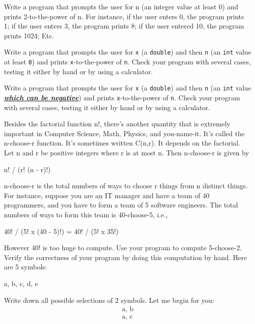 \begin{ex}
Write a program that prompts the user for n (an
integer value at least 0) and prints 2-to-the-power of n. For instance,
if the user enters 0, the program prints 1; if the user enters 3, the
program prints 8; if the user entered 10, the program prints 1024; Etc.
\end{ex}

\begin{ex}
Write a program that prompts the user for \texttt{x} (a
\texttt{double}) and then \texttt{n} (an \texttt{int} value at least \texttt{0})
and prints \texttt{x}-to-the-power of \texttt{n}. Check your program with
several cases, testing it either by hand or by using a calculator.
\end{ex}

\begin{ex}
Write a program that prompts the user for \texttt{x} (a \texttt{double}) and then \texttt{n} (an \texttt{int} value \underline{\textbf{\emph{which can be negative}}}) and prints \texttt{x}-to-the-power
of \texttt{n}. Check your program with several cases, testing it either by
hand or by using a calculator.
\end{ex}
\begin{ex}
Besides the factorial function n!,
there's another quantity that is extremely important in
Computer Science, Math, Physics, and you-name-it. It's
called the n-choose-r function. It's sometimes written
C(n,r). It depends on the factorial. Let n and r be positive integers
where r is at most n. Then n-choose-r is given by
\end{ex}
\begin{center}
n! / (r! (n - r)!)
\end{center}
n-choose-r is the total numbers of ways to choose r things from n
distinct things. For instance, suppose you are an IT manager and have a
team of 40 programmers, and you have to form a team of 5 software
engineers. The total numbers of ways to form this team is 40-choose-5,
i.e.,
\begin{center}
40! / (5! x (40 - 5)!) = 40! / (5! x 35!)
\end{center}
However 40! is too huge to compute. Use your program to compute
5-choose-2. Verify the correctness of your program by doing this
computation by hand. Here are 5 symbols:

\begin{center}
a, b, c, d, e
\end{center}
Write down all possible selections of 2 symbols. Let me begin for you:
\begin{align*}
\text{a, b}\\
\text{a, c}
\end{align*}


